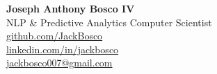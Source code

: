 \documentclass[11pt]{article}
\begin{document}
\begin{center}
    \textbf{\Huge Joseph Anthony Bosco IV} \\
    \vspace{0.2cm}
    NLP \& Predictive Analytics Computer Scientist \\
    \vspace{0.2cm}
    \href{https://github.com/JackBosco}{github.com/JackBosco} \\
    \href{https://linkedin.com/in/jackbosco}{linkedin.com/in/jackbosco} \\
    \href{mailto:jackbosco@gmail.com}{jackbosco007@gmail.com} \\
\end{center}









\end{document}
